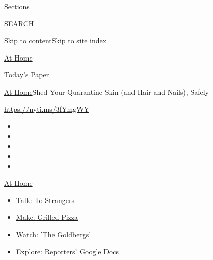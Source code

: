 Sections

SEARCH

\protect\hyperlink{site-content}{Skip to
content}\protect\hyperlink{site-index}{Skip to site index}

\href{https://www.nytimes3xbfgragh.onion/spotlight/at-home}{At Home}

\href{https://myaccount.nytimes3xbfgragh.onion/auth/login?response_type=cookie\&client_id=vi}{}

\href{https://www.nytimes3xbfgragh.onion/section/todayspaper}{Today's
Paper}

\href{/spotlight/at-home}{At Home}\textbar{}Shed Your Quarantine Skin
(and Hair and Nails), Safely

\href{https://nyti.ms/3fYmgWY}{https://nyti.ms/3fYmgWY}

\begin{itemize}
\item
\item
\item
\item
\item
\end{itemize}

\href{https://www.nytimes3xbfgragh.onion/spotlight/at-home?action=click\&pgtype=Article\&state=default\&region=TOP_BANNER\&context=at_home_menu}{At
Home}

\begin{itemize}
\tightlist
\item
  \href{https://www.nytimes3xbfgragh.onion/2020/08/03/well/family/the-benefits-of-talking-to-strangers.html?action=click\&pgtype=Article\&state=default\&region=TOP_BANNER\&context=at_home_menu}{Talk:
  To Strangers}
\item
  \href{https://www.nytimes3xbfgragh.onion/2020/08/01/at-home/coronavirus-make-pizza-on-a-grill.html?action=click\&pgtype=Article\&state=default\&region=TOP_BANNER\&context=at_home_menu}{Make:
  Grilled Pizza}
\item
  \href{https://www.nytimes3xbfgragh.onion/2020/07/31/arts/television/goldbergs-abc-stream.html?action=click\&pgtype=Article\&state=default\&region=TOP_BANNER\&context=at_home_menu}{Watch:
  'The Goldbergs'}
\item
  \href{https://www.nytimes3xbfgragh.onion/interactive/2020/at-home/even-more-reporters-editors-diaries-lists-recommendations.html?action=click\&pgtype=Article\&state=default\&region=TOP_BANNER\&context=at_home_menu}{Explore:
  Reporters' Google Docs}
\end{itemize}

